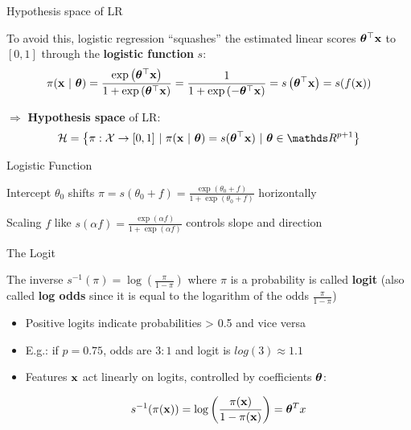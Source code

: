 \documentclass[11pt,compress,t,notes=noshow, xcolor=table]{beamer}
\begin{document}
\begin{vbframe}{Hypothesis space of LR}

To avoid this, logistic regression \enquote{squashes} the estimated linear scores $\bm{\theta}^\top \mathbf{x}$ to $[0,1]$ through the \textbf{logistic function} $s$:
$$
\pi(\mathbf{x}~|~ \bm{\theta}) = \frac{\exp\left( \bm{\theta}^\top \mathbf{x} \right)}{1+\exp\left(\bm{\theta}^\top \mathbf{x} \right)} = \frac{1}{1+\exp\left( -\bm{\theta}^\top \mathbf{x} \right)} = s\left( \bm{\theta}^\top \mathbf{x} \right) = s(f(\mathbf{x}))
$$


$\Rightarrow$ \textbf{Hypothesis space} of LR:
$$
  \Hspace = \left\{\pi: \Xspace \to [0,1] ~|~\pixt = s(\thx) ~|~ \thetav \in \R^{p+1} \right\}
$$

\end{vbframe}

\begin{vbframe}{Logistic Function}

Intercept $\theta_0$ shifts $\pi = s(\theta_0 + f) = \frac{\exp(\theta_0 + f)}{1+\exp(\theta_0 + f)}$ horizontally


Scaling $f$ like $s(\alpha f) = \frac{\exp(\alpha f)}{1+\exp(\alpha f)}$ controls slope and direction


\end{vbframe}

\begin{vbframe}{The Logit}

The inverse $s^{-1}(\pi) = \log\left(\frac{\pi}{1 - \pi}\right)$ where $\pi$ is a probability is called \textbf{logit} (also called \textbf{log odds} since it is equal to the logarithm of the odds $\frac{\pi}{1-\pi}$)


\begin{itemize}

\item Positive logits indicate probabilities > 0.5 and vice versa

\item E.g.: if $p = 0.75$, odds are $3:1$ and logit is $log(3) \approx 1.1$

\item Features $\mathbf{x}$ act linearly on logits, controlled by coefficients $\bm{\theta}$:

$$
s^{-1}(\pi(\mathbf{x})) = \log\left(\frac{\pi(\mathbf{x})}{1 - \pi(\mathbf{x})}\right) = \bm{\theta}^T x
$$

\end{itemize}


\end{vbframe}
\end{document}

